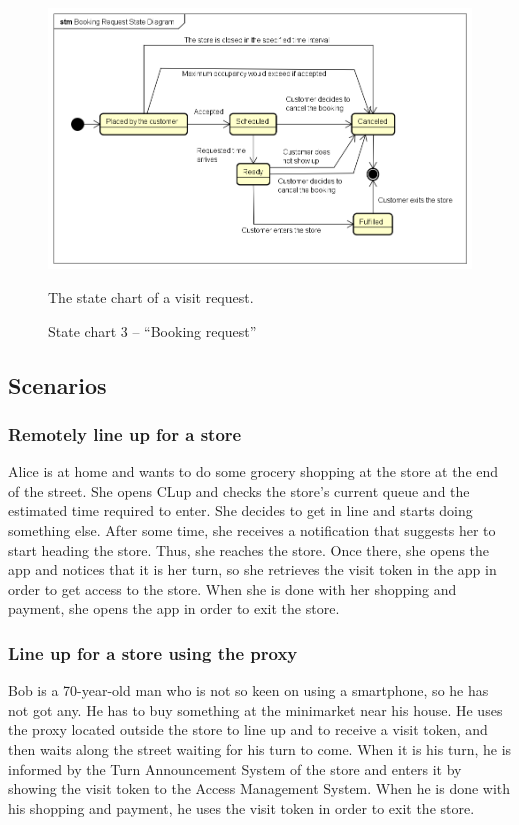 \documentclass[a4paper,oneside,11pt]{book}   %
\newcommand{\captionrasd}[2]{\caption{#1}\par\begin{center}\vspace{-.01\textheight}\small#2.\end{center}}
\begin{document}
    \begin{figure}[H]
        \centering
        \includegraphics[width=.85\textwidth, keepaspectratio]{pictures/state_diagrams/booking_request}
        \captionrasd{State chart 3 -- ``Booking request''}{The state chart of a visit request}
        \label{figure:state_chart_3_booking_request}
    \end{figure}
    \subsection{Scenarios}
        \subsubsection{Remotely line up for a store}
        Alice is at home and wants to do some grocery shopping at the store at the end of the street. She opens CLup and checks the store’s current queue and the estimated time required to enter. She decides to get in line and starts doing something else. After some time, she receives a notification that suggests her to start heading the store. Thus, she reaches the store. Once there, she opens the app and notices that it is her turn,  so she retrieves the visit token in the app in order to get access to the store. When she is done with her shopping and payment, she opens the app in order to exit the store.
        \subsubsection{Line up for a store using the proxy}
        Bob is a 70-year-old man who is not so keen on using a smartphone, so he has not got any. He has to buy something at the minimarket near his house. He uses the proxy located outside the store to line up and to receive a visit token, and then waits along the street waiting for his turn to come. When it is his turn, he is informed by the Turn Announcement System of the store and enters it by showing the visit token to the Access Management System.  When he is done with his shopping and payment, he uses the visit token in order to exit the store.
\end{document}
